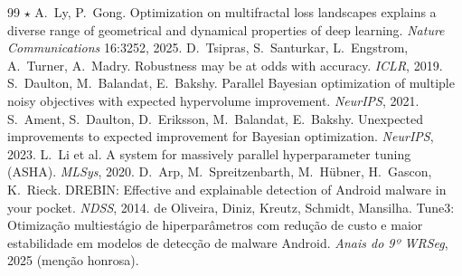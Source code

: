 \begin{thebibliography}{99}
 $\star$ A.\ Ly, P.\ Gong. Optimization on multifractal loss landscapes explains a diverse range of geometrical and dynamical properties of deep learning. \emph{Nature Communications} 16:3252, 2025.
 D.\ Tsipras, S.\ Santurkar, L.\ Engstrom, A.\ Turner, A.\ Madry. Robustness may be at odds with accuracy. \emph{ICLR}, 2019.
 S.\ Daulton, M.\ Balandat, E.\ Bakshy. Parallel Bayesian optimization of multiple noisy objectives with expected hypervolume improvement. \emph{NeurIPS}, 2021.
 S.\ Ament, S.\ Daulton, D.\ Eriksson, M.\ Balandat, E.\ Bakshy. Unexpected improvements to expected improvement for Bayesian optimization. \emph{NeurIPS}, 2023.
 L.\ Li et al. A system for massively parallel hyperparameter tuning (ASHA). \emph{MLSys}, 2020.
 D.\ Arp, M.\ Spreitzenbarth, M.\ Hübner, H.\ Gascon, K.\ Rieck. DREBIN: Effective and explainable detection of Android malware in your pocket. \emph{NDSS}, 2014.
 de Oliveira, Diniz, Kreutz, Schmidt, Mansilha. Tune3: Otimização multiestágio de hiperparâmetros com redução de custo e maior estabilidade em modelos de detecção de malware Android. \emph{Anais do 9º WRSeg}, 2025 (menção honrosa).
\end{thebibliography}


